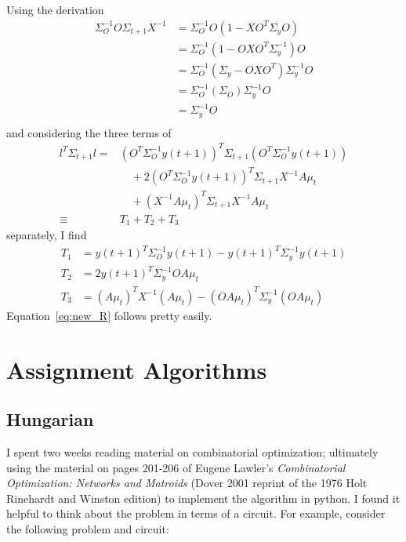 \documentclass[12pt]{article}
\newcommand{\ti}[2]{{#1}{(#2)}}                         %
\begin{document}
Using the derivation
\begin{align*}
  \Sigma_O^{-1} O \Sigma_{t+1} X^{-1} &=
  \Sigma_O^{-1}O(1-XO^T\Sigma_yO) \\
  &= \Sigma_O^{-1}(1-OXO^T\Sigma_y^{-1})O \\
  &= \Sigma_O^{-1}(\Sigma_y-OXO^T)\Sigma_y^{-1}O \\
  &= \Sigma_O^{-1}(\Sigma_O)\Sigma_y^{-1}O \\
  &= \Sigma_y^{-1}O \\
\end{align*}
and considering the three terms of
\begin{align*}
  l^T \Sigma_{t+1} l = & (O^T\Sigma_O^{-1} \ti{y}{t+1})^T \Sigma_{t+1}
  (O^T\Sigma_O^{-1} \ti{y}{t+1}) \\
  & \quad + 2(O^T\Sigma_O^{-1} \ti{y}{t+1})^T \Sigma_{t+1} X^{-1}A\mu_t \\
  & \quad + (X^{-1}A\mu_t)^T\Sigma_{t+1} X^{-1}A\mu_t \\
  \equiv & T_1+T_2+T_3
\end{align*}
separately, I find
\begin{align*}
  T_1 &= \ti{y}{t+1}^T \Sigma_O^{-1} \ti{y}{t+1} - \ti{y}{t+1}^T
  \Sigma_y^{-1} \ti{y}{t+1} \\
  T_2 &= 2 \ti{y}{t+1}^T \Sigma_y^{-1} OA\mu_t \\
  T_3 &= (A\mu_t)^T X^{-1} (A\mu_t) - (OA\mu_t)^T
  \Sigma_y^{-1}(OA\mu_t)
\end{align*}
Equation~\eqref{eq:new_R} follows pretty easily.

\section{Assignment Algorithms}
\label{sec:assignment}

\subsection{Hungarian}
\label{sec:hungarian}

I spent two weeks reading material on combinatorial optimization;
ultimately using the material on pages 201-206 of Eugene Lawler's
\emph{Combinatorial Optimization: Networks and Matroids} (Dover 2001
reprint of the 1976 Holt Rinehardt and Winston edition) to implement
the algorithm in python.  I found it helpful to think about the
problem in terms of a circuit.  For example, consider the following
problem and circuit:
\end{document}
